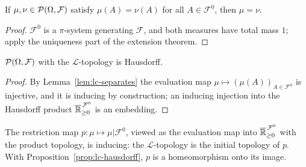 \begin{lemma}
    \label{lem:lc-separates}
    \leanok

    If $\mu, \nu \in \mathcal{P}(\Omega, \mathcal{F})$ satisfy $\mu(A) = \nu(A)$ for all
    $A \in \mathcal{F}^0$, then $\mu = \nu$.
\end{lemma}
\begin{proof}
    \leanok

    $\mathcal{F}^0$ is a $\pi$-system generating $\mathcal{F}$, and both measures have total
    mass $1$; apply the uniqueness part of the extension theorem.
\end{proof}

\begin{proposition}
    \label{prop:lc-hausdorff}
    \leanok

    $\mathcal{P}(\Omega, \mathcal{F})$ with the $\mathcal{L}$-topology is Hausdorff.
\end{proposition}
\begin{proof}
    \leanok

    By Lemma~\ref{lem:lc-separates} the evaluation map
    $\mu \mapsto (\mu(A))_{A \in \mathcal{F}^0}$ is injective, and it is inducing by
    construction; an inducing injection into the Hausdorff product
    $\overline{\mathbb{R}}_{\ge 0}^{\,\mathcal{F}^0}$ is an embedding.
\end{proof}

\begin{remark}
    \label{rmk:lc-initial-topology}
    \leanok

    The restriction map $p : \mu \mapsto \mu | \mathcal{F}^0$, viewed as the evaluation map into
    $\overline{\mathbb{R}}_{\ge 0}^{\,\mathcal{F}^0}$ with the product topology, is inducing: the
    $\mathcal{L}$-topology is the initial topology of $p$. With
    Proposition~\ref{prop:lc-hausdorff}, $p$ is a homeomorphism onto its image.
\end{remark}

